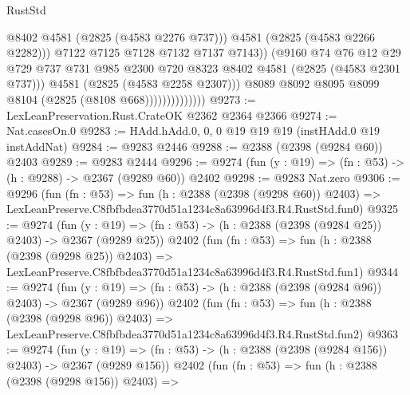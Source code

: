 \begin{lexlean}{RustStd}
\begin{coremodule}
                                      @8402
                                      @4581
                                      (@2825 (@4583 @2276 @737)))
                                    @4581
                                    (@2825 (@4583 @2266 @2282)))
                                  @7122
                                  @7125
                                  @7128
                                  @7132
                                  @7137
                                  @7143))
                              (@9160
                                @74
                                @76
                                @12
                                @29
                                @729
                                @737
                                @731
                                @985
                                @2300
                                @720
                                @8323
                                @8402
                                @4581
                                (@2825 (@4583 @2301 @737)))
                              @4581
                              (@2825 (@4583 @2258 @2307)))
                            @8089
                            @8092
                            @8095
                            @8099
                            @8104
                            (@2825 (@8108 @668))))))))))))))
@9273 := LexLeanPreservation.Rust.CrateOK @2362 @2364 @2366
@9274 := Nat.casesOn.{0}
@9283 := HAdd.hAdd.{0, 0, 0} @19 @19 @19 (instHAdd.{0} @19 instAddNat)
@9284 := @9283 @2446
@9288 := @2388 (@2398 (@9284 @60)) @2403
@9289 := @9283 @2444
@9296 := @9274 (fun (y : @19) => (fn : @53) -> (h : @9288) -> @2367 (@9289 @60)) @2402
@9298 := @9283 Nat.zero
@9306 := @9296
    (fun (fn : @53) =>
    fun (h : @2388 (@2398 (@9298 @60)) @2403) =>
    LexLeanPreserve.C8fbfbdea3770d51a1234c8a63996d4f3.R4.RustStd.fun0)
@9325 := @9274
    (fun (y : @19) => (fn : @53) -> (h : @2388 (@2398 (@9284 @25)) @2403) -> @2367 (@9289 @25))
    @2402
    (fun (fn : @53) =>
    fun (h : @2388 (@2398 (@9298 @25)) @2403) =>
    LexLeanPreserve.C8fbfbdea3770d51a1234c8a63996d4f3.R4.RustStd.fun1)
@9344 := @9274
    (fun (y : @19) => (fn : @53) -> (h : @2388 (@2398 (@9284 @96)) @2403) -> @2367 (@9289 @96))
    @2402
    (fun (fn : @53) =>
    fun (h : @2388 (@2398 (@9298 @96)) @2403) =>
    LexLeanPreserve.C8fbfbdea3770d51a1234c8a63996d4f3.R4.RustStd.fun2)
@9363 := @9274
    (fun (y : @19) => (fn : @53) -> (h : @2388 (@2398 (@9284 @156)) @2403) -> @2367 (@9289 @156))
    @2402
    (fun (fn : @53) =>
    fun (h : @2388 (@2398 (@9298 @156)) @2403) =>

\end{coremodule}
\end{lexlean}
